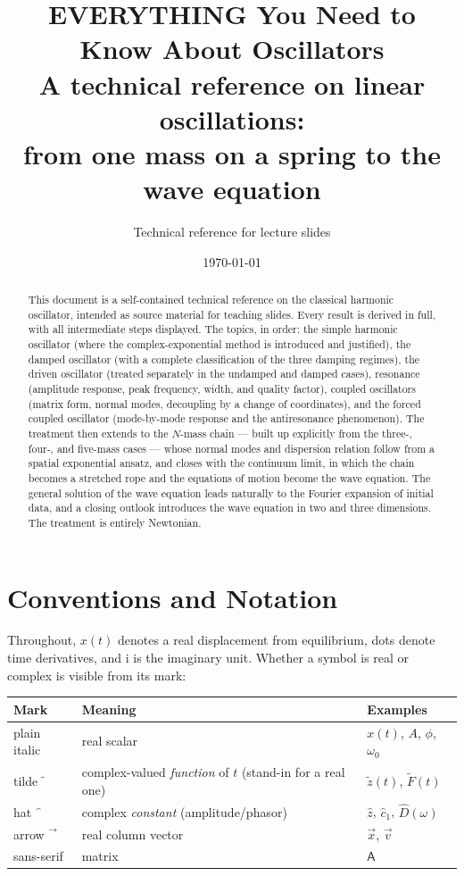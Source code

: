 \documentclass[11pt]{article}
\title{\bfseries EVERYTHING You Need to Know About Oscillators\\[4pt]
\large A technical reference on linear oscillations:\\
from one mass on a spring to the wave equation}
\author{Technical reference for lecture slides}
\date{\today}
\theoremstyle{plain}
\theoremstyle{definition}
\theoremstyle{remark}
\newcommand{\ii}{\mathrm{i}}
\newcommand{\vx}{\vec{x}}
\newcommand{\vv}{\vec{v}}
\newcommand{\mA}{\mathsf{A}}
\begin{document}
\maketitle

\begin{abstract}
\noindent
This document is a self-contained technical reference on the classical harmonic
oscillator, intended as source material for teaching slides. Every result is
derived in full, with all intermediate steps displayed. The topics, in order:
the simple harmonic oscillator (where the complex-exponential method is
introduced and justified), the damped oscillator (with a complete
classification of the three damping regimes), the driven oscillator (treated
separately in the undamped and damped cases), resonance (amplitude response,
peak frequency, width, and quality factor), coupled oscillators (matrix form,
normal modes, decoupling by a change of coordinates), and the forced coupled
oscillator (mode-by-mode response and the antiresonance phenomenon). The
treatment then extends to the $N$-mass chain --- built up explicitly from the
three-, four-, and five-mass cases --- whose normal modes and dispersion
relation follow from a spatial exponential ansatz, and closes with the
continuum limit, in which the chain becomes a stretched rope and the
equations of motion become the wave equation. The general solution of the
wave equation leads naturally to the Fourier expansion of initial data, and
a closing outlook introduces the wave equation in two and three dimensions.
The treatment is entirely Newtonian.
\end{abstract}

\clearpage
\tableofcontents
\clearpage

\section{Conventions and Notation}

Throughout, $x(t)$ denotes a real displacement from equilibrium, dots denote
time derivatives, and $\ii$ is the imaginary unit. Whether a symbol is real
or complex is visible from its mark:

\begin{center}
\begin{tabular}{lll}
\toprule
Mark & Meaning & Examples \\
\midrule
plain italic & real scalar & $x(t)$, $A$, $\phi$, $\omega_0$ \\
tilde $\tilde{\phantom{z}}$ & complex-valued \emph{function} of $t$ (stand-in for a real one) & $\tilde z(t)$, $\tilde F(t)$ \\
hat $\hat{\phantom{z}}$ & complex \emph{constant} (amplitude/phasor) & $\hat z$, $\hat c_1$, $\hat D(\omega)$ \\
arrow $\vec{\phantom{x}}$ & real column vector & $\vx$, $\vv$ \\
sans-serif & matrix & $\mA$ \\
\bottomrule
\end{tabular}
\end{center}
\end{document}
